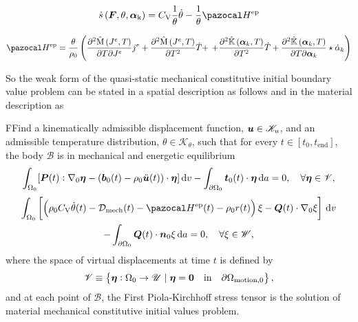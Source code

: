 \begin{equation}
\dot{s}\left(\boldsymbol{F}, \theta, \bm{\alpha}_{\mathrm{k}}\right)= C_{\mathrm{V}} \frac{1}{\theta} \dot{\theta}- \frac{1}{\theta}\pazocal H^\text{ep}
\end{equation}



\begin{equation}
\pazocal H^\text{ep} =  \frac{\theta}{\rho_{0}}\left(\frac{\partial^{2} \hat{\mathrm{M}}\left(J^{e}, T\right)}{\partial T \partial J^{e}} j^{e}+\frac{\partial^{2} \hat{\mathrm{M}}\left(J^{e}, T\right)}{\partial T^{2}} \dot{T}+\right.
\left.+\frac{\partial^{2} \hat{\mathbb{K}}\left(\boldsymbol{\alpha}_{k}, T\right)}{\partial T^{2}} \dot{T}+\frac{\partial^{2} \hat{\mathbb{K}}\left(\boldsymbol{\alpha}_{k}, T\right)}{\partial T \partial \boldsymbol{\alpha}_{k}} \star \dot{\alpha}_{k}\right)
\end{equation}



So the weak form of the quasi-static mechanical constitutive initial boundary value problem can be stated in a spatial description as follows
and in the material description as
\begin{problem}
    FFind a kinematically admissible displacement function, $\bm{u}\in \mathscr{K}_u$, and an admissible temperature distribution, \(\theta \in \mathscr K_\theta\), such that for every $t\in [t_0,t_\text{end}]$, the body $\mathscr{B}$ is in mechanical and energetic equilibrium
        \begin{equation}
        \int_{\Omega_0} [\bm{P}(t):\nabla_0 \bm{\eta} - (\bm{b}_0(t)-\rho_0\ddot{\bm u}(t))\cdot \bm{\eta}]\,\mathrm{d} v - \int_{\partial\Omega_0} \bm{t}_0(t)\cdot \bm{\eta}\,\mathrm{d} a = 0,\quad \forall \bm{\eta} \in \mathscr{V},
        \end{equation}
        \begin{multline}
        \int_{\Omega_0}   \left[\left(\rho_0C_\mathrm{V}\dot\theta(t) -\mathcal D_\text{mech}(t) - \pazocal H^\text{ep}(t) - \rho_0 r(t)\right) \xi - \bm Q(t)\cdot \nabla_0 \xi\right]\ud v\\ - \int_{\partial\Omega_0} \bm Q(t)\cdot \bm n_0 \xi\ud a = 0,\quad \forall \xi \in \mathscr{W},
    \end{multline}
    where the space of virtual displacements at time $t$ is defined by
    \begin{equation}
        \mathscr{V} \equiv \left\{\bm{\eta}:\Omega_0\to \mathscr{U}\;|\;\bm{\eta} = \bm{0}\quad \text{in}\quad \partial\Omega_\text{motion,0}\right\},
    \end{equation}
    and at each point of $\mathscr{B}$, the First Piola-Kirchhoff stress tensor is the solution of material mechanical constitutive initial values problem.
\end{problem}

